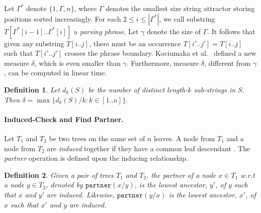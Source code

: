 \documentclass[smallabstract,smallcaptions]{dccpaper}
\newtheorem{definition}{Definition}
\newtheorem{lemma}{Lemma}
\def\idtt#1{\ensuremath{\mathtt{#1}}}
\def\partner{\idtt{partner}}
\begin{document}
	Let $\Gamma^{*}$ denote $\{1, \Gamma, n\}$, where $\Gamma$ denotes the smallest size string attractor storing positions sorted increasingly.
	For each $2\leq i\leq |\Gamma^*|$, we call substring $T[\Gamma^{*}[i-1].. \Gamma^{*}[i]]$ a {\em parsing phrase}.
	Let $\gamma$ denote the size of $\Gamma$.
	It follows that given any substring $T[i..j]$, there must be an occurrence $T[i'..j']=T[i..j]$ such that $T[i'..j']$ crosses the phrase boundary.
	Kociumaka et al.~\cite{kociumaka2021towards} defined a new measure $\delta$, which is even smaller than $\gamma$.
	Furthermore, measure $\delta$, different from $\gamma$, can be computed in linear time.
	\begin{definition}\cite{kociumaka2021towards}
		Let $d_k(S)$ be the number of distinct length-$k$ sub-strings in $S$. Then
		$\delta = \max\{d_k(S)/k: k\in[1..n]\}.$
	\end{definition}
	
	
	\paragraph{Induced-Check and Find Partner.} Let $T_{1}$ and $T_{2}$ be two trees on the same set of $n$ leaves.
	A node from $T_{1}$ and a node from $T_{2}$ are {\em induced} together if they have a common leaf descendant \cite{gagie2013heaviest}.
	The {\em partner} operation \cite{abedin2018heaviest} is defined upon the inducing relationship.%
	\begin{definition}\cite{abedin2018heaviest} 
		Given a pair of trees $T_{1}$ and $T_{2}$, the partner of a node $x\in T_{1}$ w.r.t a node $y \in T_{2}$, denoted by $\partner(x/y)$, is the lowest ancestor, $y'$, of $y$ such that $x$ and $y'$ are induced. Likewise, $\partner(y/x)$ is the lowest ancestor, $x'$, of $x$ such that $x'$ and $y$ are induced.
	\end{definition}
	
	
\end{document}
